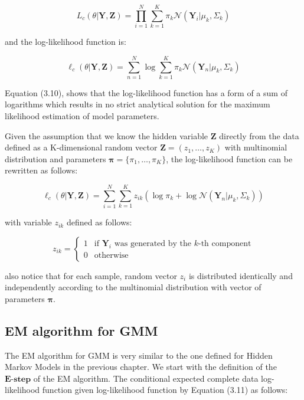 \begin{equation}
    L_c(\theta|\textbf{Y},\textbf{Z}) = \prod_{i=1}^{N} \sum_{k=1}^{K} \pi_k \mathcal{N}(\textbf{Y}_i|\mu_k,\Sigma_k)
\end{equation}

and the log-likelihood function is:

\begin{equation}
    \ell_c(\theta|\textbf{Y},\textbf{Z}) = \sum_{n=1}^{N} \log \sum_{k=1}^{K} \pi_k \mathcal{N}(\textbf{Y}_n|\mu_k,\Sigma_k)
\end{equation}

Equation (3.10), shows that the log-likelihood function has a form of a sum of logarithms which results in no strict analytical solution for the maximum likelihood estimation of model parameters.

Given the assumption that we know the hidden variable $\textbf{Z}$ directly from the data defined as a K-dimensional random vector $\textbf{Z}=(z_1,\ldots,z_K)$ 
with multinomial distribution and parameters $\boldsymbol{\pi} = \{\pi_1,\ldots,\pi_K\}$, the log-likelihood function can be rewritten as follows:

\begin{equation}
    \ell_c(\theta|\textbf{Y},\textbf{Z}) = \sum_{i=1}^{N} \sum_{k=1}^{K} z_{ik} \left(\log \pi_k + \log \mathcal{N}(\textbf{Y}_n|\mu_k,\Sigma_k)\right)
\end{equation}

with variable $z_{ik}$ defined as follows:

\begin{equation}
    z_{ik} = \begin{cases}
        1 & \text{if } \textbf{Y}_i \text{ was generated by the } k\text{-th component} \\
        0 & \text{otherwise}
    \end{cases}
\end{equation}

also notice that for each sample, random vector $z_{i}$ is distributed identically and independently according to the multinomial distribution with vector of parameters $\boldsymbol{\pi}$.

\subsection{EM algorithm for GMM}

The EM algorithm for GMM is very similar to the one defined for Hidden Markov Models in the previous chapter. 
We start with the definition of the $\textbf{E-step}$ of the EM algorithm. The conditional expected complete 
data log-likelihood function given log-likelihood function by Equation (3.11) as follows:

